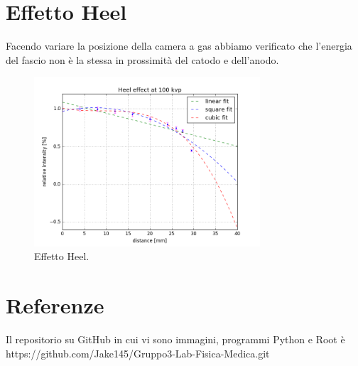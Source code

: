 \documentclass[a4paper]{article}
\begin{document}
\section{Effetto Heel}
Facendo variare la posizione della camera a gas abbiamo verificato che l'energia del fascio non è la stessa in prossimità del catodo e dell'anodo.
\begin{figure}[H]
\centering
\includegraphics[width=0.75\textwidth]{heel100pvk.png}
\caption{Effetto Heel.}
\end{figure}
	
\section{Referenze}
Il repositorio su GitHub in cui vi sono immagini, programmi Python e Root è https://github.com/Jake145/Gruppo3-Lab-Fisica-Medica.git
\end{document}
